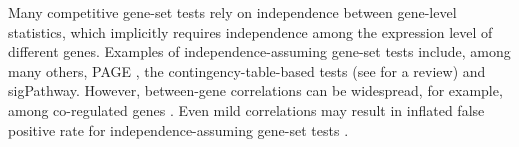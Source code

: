 \documentclass[a4,center,fleqn]{NAR}
\newcommand{\gen}{geneSetTest}
\begin{document}
Many competitive gene-set tests rely on independence between gene-level statistics, which 
implicitly requires independence among the expression level of different genes.
Examples of  independence-assuming gene-set tests include, among many others, PAGE 
\citep{kim2005page}, the 
contingency-table-based tests (see \citet{huang2009bioinformatics} 
for a review) and sigPathway\citep{Smyth2004moderated,tian2005discovering}. 
However, between-gene correlations can be widespread, for example, among co-regulated genes 
\citep{gatti2010heading}.  Even mild correlations may result in inflated false 
positive rate for independence-assuming gene-set tests 
\citep{efron2007testing,gatti2010heading,goeman2007analyzing, 
	wu2012camera,yaari2013quantitative}.
\end{document}
